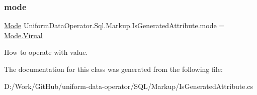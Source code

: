 \subsubsection{\texorpdfstring{mode}{mode}}
{\footnotesize\ttfamily \mbox{\hyperlink{class_uniform_data_operator_1_1_sql_1_1_markup_1_1_is_generated_attribute_a03e5e76ff63dbcf2cca5746e3098b23d}{Mode}} Uniform\+Data\+Operator.\+Sql.\+Markup.\+Is\+Generated\+Attribute.\+mode = \mbox{\hyperlink{class_uniform_data_operator_1_1_sql_1_1_markup_1_1_is_generated_attribute_a03e5e76ff63dbcf2cca5746e3098b23daa6d194ab7efe0417c28a02b8a8997bd0}{Mode.\+Virual}}}



How to operate with value. 



The documentation for this class was generated from the following file\+:\begin{DoxyCompactItemize}
\item 
D\+:/\+Work/\+Git\+Hub/uniform-\/data-\/operator/\+S\+Q\+L/\+Markup/Is\+Generated\+Attribute.\+cs\end{DoxyCompactItemize}
